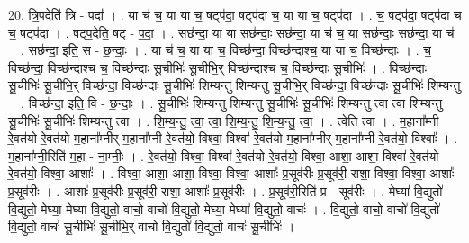 \documentclass[17pt]{extarticle}
\begin{document}
20. त्रि॒पदेति॑ त्रि - पदा᳚ । . या च॑ च॒ या या च॒ षट्प॑दा॒ षट्प॑दा च॒ या या च॒ षट्प॑दा । . च॒ षट्प॑दा॒ षट्प॑दा च च॒ षट्प॑दा । . षट्प॒देति॒ षट् - प॒दा॒ । . सछ॑न्दा॒ या या सछ॑न्दाः॒ सछ॑न्दा॒ या च॑ च॒ या सछ॑न्दाः॒ सछ॑न्दा॒ या च॑ । . सछ॑न्दा॒ इति॒ स - छ॒न्दाः॒ । . या च॑ च॒ या या च॒ विच्छ॑न्दा॒ विच्छ॑न्दाश्च॒ या या च॒ विच्छ॑न्दाः । . च॒ विच्छ॑न्दा॒ विच्छ॑न्दाश्च च॒ विच्छ॑न्दाः सू॒चीभिः॑ सू॒चीभि॒र् विच्छ॑न्दाश्च च॒ विच्छ॑न्दाः सू॒चीभिः॑ । . विच्छ॑न्दाः सू॒चीभिः॑ सू॒चीभि॒र् विच्छ॑न्दा॒ विच्छ॑न्दाः सू॒चीभिः॑ शिम्यन्तु शिम्यन्तु सू॒चीभि॒र् विच्छ॑न्दा॒ विच्छ॑न्दाः सू॒चीभिः॑ शिम्यन्तु । . विच्छ॑न्दा॒ इति॒ वि - छ॒न्दाः॒ । . सू॒चीभिः॑ शिम्यन्तु शिम्यन्तु सू॒चीभिः॑ सू॒चीभिः॑ शिम्यन्तु त्वा त्वा शिम्यन्तु सू॒चीभिः॑ सू॒चीभिः॑ शिम्यन्तु त्वा । . शि॒म्य॒न्तु॒ त्वा॒ त्वा॒ शि॒म्य॒न्तु॒ शि॒म्य॒न्तु॒ त्वा॒ । . त्वेति॑ त्वा । . म॒हाना᳚म्नी रे॒वत॑यो रे॒वत॑यो म॒हाना᳚म्नीर् म॒हाना᳚म्नी रे॒वत॑यो॒ विश्वा॒ विश्वा॑ रे॒वत॑यो म॒हाना᳚म्नीर् म॒हाना᳚म्नी रे॒वत॑यो॒ विश्वाः᳚ । . म॒हाना᳚म्नी॒रिति॑ म॒हा - ना॒म्नीः॒ । . रे॒वत॑यो॒ विश्वा॒ विश्वा॑ रे॒वत॑यो रे॒वत॑यो॒ विश्वा॒ आशा॒ आशा॒ विश्वा॑ रे॒वत॑यो रे॒वत॑यो॒ विश्वा॒ आशाः᳚ । . विश्वा॒ आशा॒ आशा॒ विश्वा॒ विश्वा॒ आशाः᳚ प्र॒सूव॑रीः प्र॒सूव॑री॒ राशा॒ विश्वा॒ विश्वा॒ आशाः᳚ प्र॒सूव॑रीः । . आशाः᳚ प्र॒सूव॑रीः प्र॒सूव॑री॒ राशा॒ आशाः᳚ प्र॒सूव॑रीः । . प्र॒सूव॑री॒रिति॑ प्र - सूव॑रीः । . मेघ्या॑ वि॒द्युतो॑ वि॒द्युतो॒ मेघ्या॒ मेघ्या॑ वि॒द्युतो॒ वाचो॒ वाचो॑ वि॒द्युतो॒ मेघ्या॒ मेघ्या॑ वि॒द्युतो॒ वाचः॑ । . वि॒द्युतो॒ वाचो॒ वाचो॑ वि॒द्युतो॑ वि॒द्युतो॒ वाचः॑ सू॒चीभिः॑ सू॒चीभि॒र् वाचो॑ वि॒द्युतो॑ वि॒द्युतो॒ वाचः॑ सू॒चीभिः॑ । \newline
\end{document}
